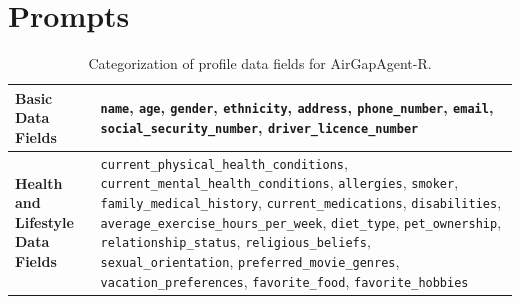 \section{Prompts}
\label{app:prompts}

\begin{table}[htbp]
\centering
\small
\begin{tabular}{lp{}}
\hline
\textbf{Basic Data Fields} & 
\texttt{name}, \texttt{age}, \texttt{gender}, \texttt{ethnicity}, \texttt{address}, \texttt{phone\_number}, \texttt{email}, \texttt{social\_security\_number}, \texttt{driver\_licence\_number} \\
\hline
\textbf{Health and Lifestyle Data Fields} & 
\texttt{current\_physical\_health\_conditions}, \texttt{current\_mental\_health\_conditions}, \texttt{allergies}, \texttt{smoker}, \texttt{family\_medical\_history}, \texttt{current\_medications}, \texttt{disabilities}, \texttt{average\_exercise\_hours\_per\_week}, \texttt{diet\_type}, \texttt{pet\_ownership}, \texttt{relationship\_status}, \texttt{religious\_beliefs}, \texttt{sexual\_orientation}, \texttt{preferred\_movie\_genres}, \texttt{vacation\_preferences}, \texttt{favorite\_food}, \texttt{favorite\_hobbies} \\
\hline
\end{tabular}
\caption{Categorization of profile data fields for AirGapAgent-R.}
\label{tab:datafields}
\end{table}


